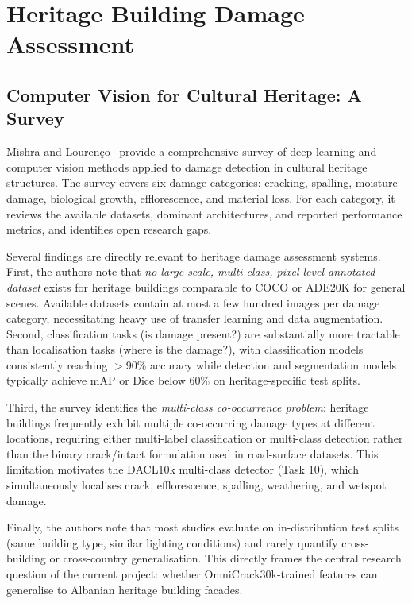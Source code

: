 \documentclass[12pt,a4paper]{article}
\begin{document}
\section{Heritage Building Damage Assessment}
\label{sec:heritage}

\subsection{Computer Vision for Cultural Heritage: A Survey}

Mishra and Louren\c{c}o~\cite{mishra2024heritage} provide a comprehensive survey of deep learning and computer vision methods applied to damage detection in cultural heritage structures. The survey covers six damage categories: cracking, spalling, moisture damage, biological growth, efflorescence, and material loss. For each category, it reviews the available datasets, dominant architectures, and reported performance metrics, and identifies open research gaps.

Several findings are directly relevant to heritage damage assessment systems. First, the authors note that \textit{no large-scale, multi-class, pixel-level annotated dataset} exists for heritage buildings comparable to COCO or ADE20K for general scenes. Available datasets contain at most a few hundred images per damage category, necessitating heavy use of transfer learning and data augmentation. Second, classification tasks (is damage present?) are substantially more tractable than localisation tasks (where is the damage?), with classification models consistently reaching $>$90\% accuracy while detection and segmentation models typically achieve mAP or Dice below 60\% on heritage-specific test splits.

Third, the survey identifies the \textit{multi-class co-occurrence problem}: heritage buildings frequently exhibit multiple co-occurring damage types at different locations, requiring either multi-label classification or multi-class detection rather than the binary crack/intact formulation used in road-surface datasets. This limitation motivates the DACL10k multi-class detector (Task 10), which simultaneously localises crack, efflorescence, spalling, weathering, and wetspot damage.

Finally, the authors note that most studies evaluate on in-distribution test splits (same building type, similar lighting conditions) and rarely quantify cross-building or cross-country generalisation. This directly frames the central research question of the current project: whether OmniCrack30k-trained features can generalise to Albanian heritage building facades.
\end{document}
